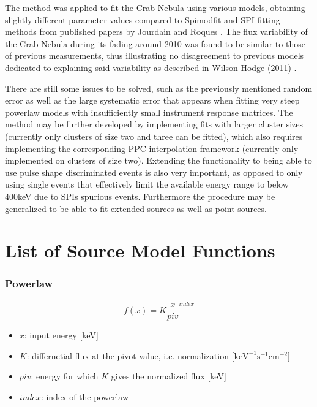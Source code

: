 \documentclass{report}
\begin{document}
The method was applied to fit the Crab Nebula using various models, obtaining slightly different parameter values compared to Spimodfit and SPI fitting methods from published papers by Jourdain and Roques \cite{2009ApJ...704...17J}\cite{Roques}. The flux variability of the Crab Nebula during its fading around 2010 was found to be similar to those of previous measurements, thus illustrating no disagreement to previous models dedicated to explaining said variability as described in Wilson Hodge (2011) \cite{Wilson_Hodge_2011}. 

There are still some issues to be solved, such as the previously mentioned random error as well as the large systematic error that appears when fitting very steep powerlaw models with insufficiently small instrument response matrices. The method may be further developed by implementing fits with larger cluster sizes (currently only clusters of size two and three can be fitted), which also requires implementing the corresponding PPC interpolation framework (currently only implemented on clusters of size two). Extending the functionality to being able to use pulse shape discriminated events is also very important, as opposed to only using single events that effectively limit the available energy range to below 400keV due to SPIs spurious events. Furthermore the procedure may be generalized to be able to fit extended sources as well as point-sources. 

\appendix
\chapter{List of Source Model Functions}\label{chp source models}

\subsection*{Powerlaw}

\begin{equation} \label{powerlaw}
  f(x) = K \frac{x}{piv}^{index}
\end{equation}

\begin{itemize}
  \item $x$: input energy [keV]
  \item $K$: differnetial flux at the pivot value, i.e. normalization [$\text{keV}^{-1}\text{s}^{-1}\text{cm}^{-2}$]
  \item $piv$: energy for which $K$ gives the normalized flux [keV]
  \item $index$: index of the powerlaw
\end{itemize}
\end{document}
